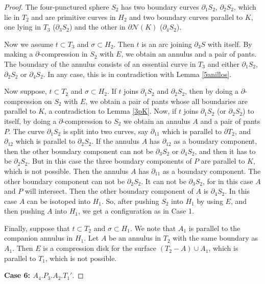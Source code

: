 \documentclass[12pt]{amsart}
\begin{document}
\begin{proof}
The four-punctured sphere $S_2$ has two boundary curves $\partial_1 S_2$, $\partial_2 S_2$, which lie in $T_2$ and are primitive curves in $H_2$ and two boundary curves parallel to $K$, one lying in $T_3$ ($\partial_3 S_2$) and the other in $\partial\mathcal{N}(K)$ ($\partial_4 S_2$).

Now we assume $t\subset T_3$ and $\sigma\subset H_2$. Then $t$ is an arc joining $\partial_3 S$ with itself. By making a $\partial$-compression in $S_2$ with $E$, we obtain an annulus and a pair of pants. The boundary of the annulus consists of an essential curve in $T_3$ and either $\partial_1 S_2$, $\partial_2 S_2$ or $\partial_4 S_2$. In any case, this is in contradiction with Lemma \ref{5anillos}.

Now suppose, $t\subset T_2$ and $\sigma\subset H_2$. If $t$ joins $\partial_1 S_2$ and $\partial_2 S_2$, then by doing a $\partial$-compression on $S_2$ with $E$, we obtain a pair of pants whose all boundaries are parallel to $K$, a contradiction to Lemma \ref{3pK}. Now, if $t$ joins $\partial_1 S_2$ (or $\partial_2 S_2$) to itself, by doing a $\partial$-compression to $S_2$ we obtain an annulus $A$ and a pair of pants $P$. The curve $\partial_1 S_2$ is split into two curves, say $\partial_{11}$ which is parallel to $\partial T_2$, and $\partial_{12}$ which is parallel to $\partial_2 S_2$. If the annulus $A$ has $\partial_{12}$ as a boundary component, then the other boundary component can not be $\partial_3 S_2$ or $\partial_4 S_2$, and then it has to be $\partial_2 S_2$. But in this case the three boundary components of $P$ are parallel to $K$, which is not possible. Then the annulus $A$ has $\partial_{11}$ as a boundary component. The other boundary component can not be $\partial_2 S_2$. It can not be $\partial_3 S_2$, for in this case $A$ and $P$ will intersect. Then the other boundary component of $A$ is $\partial_4 S_2$. In this case $A$ can be isotoped into $H_1$. So, after pushing $S_2$ into $H_1$ by using $E$, and then pushing $A$ into $H_1$, we get a configuration as in Case 1.

Finally, suppose that $t\subset T_2$ and $\sigma\subset H_1$. We note that $A_1$ is parallel to the companion annulus in $H_1$. Let $A$ be an annulus in $T_2$ with the same boundary as $A_1$. Then $E$ is a compression disk for the surface $(T_2-A)\cup A_1$, which is parallel to $T_1$, which is not possible.

\vspace{1cm}

{\bf{Case 6: $A_4.P_3.A_2.T_1'$}}.



\end{proof}
\end{document}
